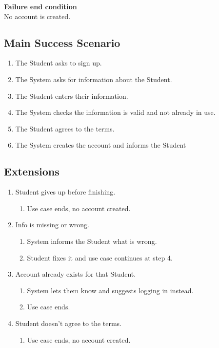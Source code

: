 \documentclass[10pt,letterpaper]{article}
\begin{document}
\textbf{Failure end condition}\\
No account is created.

\subsection*{Main Success Scenario}
\begin{enumerate}
    \item The Student asks to sign up.
    \item The System asks for information about the Student.
    \item The Student enters their information.
    \item The System checks the information is valid and not already in use.
    \item The Student agrees to the terms.
    \item The System creates the account and informs the Student
\end{enumerate}

\subsection*{Extensions}
\begin{enumerate}
    \item[3a.] Student gives up before finishing.
    \begin{enumerate}
        \item[1.] Use case ends, no account created.
    \end{enumerate}
    \item[4a.] Info is missing or wrong.
    \begin{enumerate}
        \item[1.] System informs the Student what is wrong.
        \item[2.] Student fixes it and use case continues at step 4.
    \end{enumerate}
    \item[4b.] Account already exists for that Student.
    \begin{enumerate}
        \item[1.] System lets them know and suggests logging in instead.
        \item[2.] Use case ends.
    \end{enumerate}
    \item[5a.] Student doesn't agree to the terms.
    \begin{enumerate}
        \item[1.] Use case ends, no account created.
    \end{enumerate}
\end{enumerate}
\end{document}

